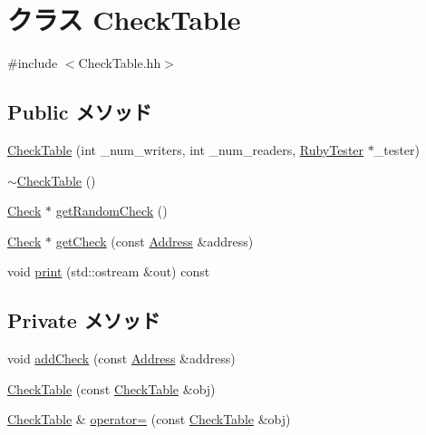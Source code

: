 \hypertarget{classCheckTable}{
\section{クラス CheckTable}
\label{classCheckTable}
}


{\ttfamily \#include $<$CheckTable.hh$>$}\subsection*{Public メソッド}
\begin{DoxyCompactItemize}
\item 
\hyperlink{classCheckTable_aed6c2bde7c6c92e895bdf796e49c9d57}{CheckTable} (int \_\-num\_\-writers, int \_\-num\_\-readers, \hyperlink{classRubyTester}{RubyTester} $\ast$\_\-tester)
\item 
\hyperlink{classCheckTable_a20cfee885e35bdf6c3f8e5d3706336e2}{$\sim$CheckTable} ()
\item 
\hyperlink{classCheck}{Check} $\ast$ \hyperlink{classCheckTable_a5fe64727ae5d3d896fd48784401d4f68}{getRandomCheck} ()
\item 
\hyperlink{classCheck}{Check} $\ast$ \hyperlink{classCheckTable_ae48218016205b6d25f2ea8289929f9e5}{getCheck} (const \hyperlink{classAddress}{Address} \&address)
\item 
void \hyperlink{classCheckTable_ac55fe386a101fbae38c716067c9966a0}{print} (std::ostream \&out) const 
\end{DoxyCompactItemize}
\subsection*{Private メソッド}
\begin{DoxyCompactItemize}
\item 
void \hyperlink{classCheckTable_ae2fdd769e0caa9423868851dac434175}{addCheck} (const \hyperlink{classAddress}{Address} \&address)
\item 
\hyperlink{classCheckTable_a49ff58d7c5aa9ffaebf3c47b54df261d}{CheckTable} (const \hyperlink{classCheckTable}{CheckTable} \&obj)
\item 
\hyperlink{classCheckTable}{CheckTable} \& \hyperlink{classCheckTable_a706745367fb31497ca5823e17715f995}{operator=} (const \hyperlink{classCheckTable}{CheckTable} \&obj)
\end{DoxyCompactItemize}
